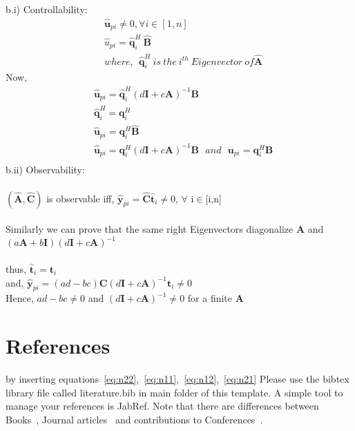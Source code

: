 \documentclass{scrreprt}
\begin{document}
b.i) Controllability:
\begin{align*}
& \hat{\bm{u}}_{pi} \neq 0 , \forall i \in [1, n]\\
& \hat{u}_{pi}=\hat{\bm{q}}_{i}^H\:\hat{\bm{B}}\\
& where,\:\: \hat{\bm{q}}_{i}^H \: is\: the\: i^{th}\: Eigenvector \:of \hat{\bm{A}}
\end{align*}
Now,
\begin{align*}
&\hat{\bm{u}}_{pi} = \hat{\bm{q}}_{i}^H(d\bm{I}+c\bm{A})^{-1}\bm{B}\\
& \hat{\bm{q}}_{i}^H = \bm{q}_{i}^H\\
& \hat{\bm{u}}_{pi} = \bm{q}_{i}^H\hat{\bm{B}}\\
& \hat{\bm{u}}_{pi} = \bm{q}_{i}^H(d\bm{I}+c\bm{A})^{-1}\bm{B} \:\:\: and \:\:\: \bm{u}_{pi} = \bm{q}_{i}^H\bm{B}\\
\end{align*}
b.ii) Observability:\\\\
$(\hat{\bm{A}},\hat{\bm{C}})$ is observable iff, $\hat{\bm{y}}_{pi}=\hat{\bm{C}}\hat{\bm{t}}_{i} \neq 0$, $\forall$  i$\in$[i,n]\\
\\
Similarly we can prove that the same right Eigenvectors diagonalize $\bm{A}$ and $(a\bm{A}+b\bm{I})(d\bm{I}+c\bm{A})^{-1}$\\
\\ 
thus, $\hat{\bm{t}}_{i}=\bm{t}_{i}$\\ 
and, $\hat{\bm{y}}_{pi}=(ad-bc)\bm{C}(d\bm{I}+c\bm{A})^{-1}\bm{t}_{i} \neq 0$\\
Hence, $ad-bc\neq 0$ and $(d\bm{I}+c\bm{A})^{-1} \neq 0$ for a finite $\bm{A}$
\section{References}
by inserting equations~\eqref{eq:n22},~\eqref{eq:n11},~\eqref{eq:n12},~\eqref{eq:n21} 
Please use the bibtex library file called literature.bib in main folder of this template. A simple tool to manage your references is JabRef. Note that there are differences between Books~\cite{Sko05}, Journal articles~\cite{Rue14} and contributions to Conferences~\cite{Mis13}.




\end{document}
